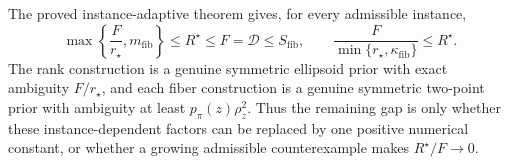 The proved instance-adaptive theorem gives, for every admissible instance,
\[
 \max\left\{\frac{F}{r_{\star}},m_{\mathrm{fib}}\right\}
 \le R^{\star}\le F=\mathcal D\le S_{\mathrm{fib}},
 \qquad
 \frac{F}{\min\{r_{\star},\kappa_{\mathrm{fib}}\}}\le R^{\star}.
\]
The rank construction is a genuine symmetric ellipsoid prior with exact ambiguity \(F/r_{\star}\), and each fiber construction is a genuine symmetric two-point prior with ambiguity at least \(p_{\pi}(z)\rho_z^2\). Thus the remaining gap is only whether these instance-dependent factors can be replaced by one positive numerical constant, or whether a growing admissible counterexample makes \(R^{\star}/F\to0\).
